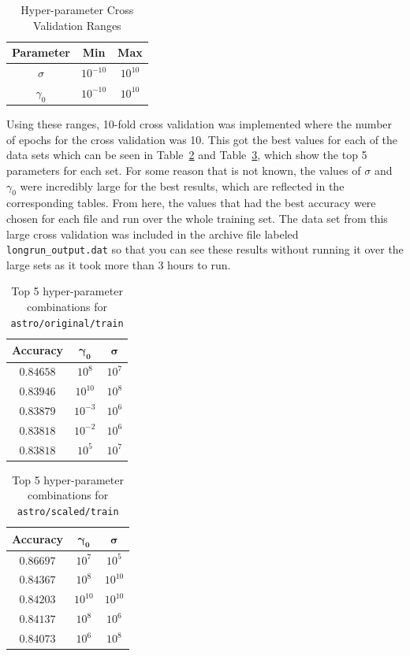 \documentclass[12pt, fullpage,letterpaper]{article}
\begin{document}
\begin{enumerate}
\begin{table}[!h]
\centering
\begin{tabular}{c | c c}
\hline\hline
{\bf Parameter} & {\bf Min} & {\bf Max}\\
\hline
$\sigma$ & $10^{-10}$ & $10^{10}$\\
$\gamma_{0}$ & $10^{-10}$ & $10^{10}$\\
\hline
\end{tabular}
\caption{Hyper-parameter Cross Validation Ranges}
\label{table:hp_range}
\end{table}

Using these ranges, 10-fold cross validation was implemented where the number of epochs for the cross validation was 10. This got the best values for each of the data sets which can be seen in Table~\ref{table:acc_orig} and Table~\ref{table:acc_scaled}, which show the top 5 parameters for each set. For some reason that is not known, the values of $\sigma$ and $\gamma_{0}$ were incredibly large for the best results, which are reflected in the corresponding tables. From here, the values that had the best accuracy were chosen for each file and run over the whole training set. The data set from this large cross validation was included in the archive file labeled \verb~longrun_output.dat~ so that you can see these results without running it over the large sets as it took more than 3 hours to run.

\begin{table}[!h]
\centering
\begin{tabular}{c c c}
\hline\hline
{\bf Accuracy} & $\boldsymbol{\gamma_{0}}$ & $\boldsymbol{\sigma}$\\
\hline
$0.84658$ & $10^{8}$ &  $10^{7}$\\
$0.83946$ & $10^{10}$ &  $10^{8}$\\
$0.83879$ & $10^{-3}$ &  $10^{6}$\\
$0.83818$ & $10^{-2}$ & $10^{6}$\\
$0.83818$ & $10^{5}$ & $10^{7}$\\
\hline
\end{tabular}
\caption{Top 5 hyper-parameter combinations for {\tt astro/original/train}}
\label{table:acc_orig}
\end{table}

\begin{table}[!h]
\centering
\begin{tabular}{c c c}
\hline\hline
{\bf Accuracy} & $\boldsymbol{\gamma_{0}}$ &  $\boldsymbol{\sigma}$\\
\hline
$0.86697$ & $10^{7}$ & $10^{5}$\\
$0.84367$ & $10^{8}$ &  $10^{10}$\\
$0.84203$ & $10^{10}$ &  $10^{10}$\\
$0.84137$ & $10^{8}$  & $10^{6}$\\
$0.84073$ & $10^{6}$ &  $10^{8}$\\
\hline
\end{tabular}
\caption{Top 5 hyper-parameter combinations for {\tt astro/scaled/train}}
\label{table:acc_scaled}
\end{table}



\end{enumerate}
\end{document}
